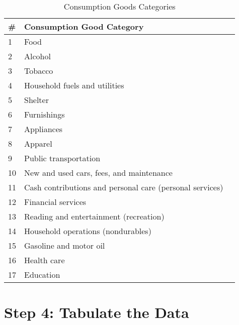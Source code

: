 \documentclass[article,11pt,letterpaper,fleqn]{article}
\theoremstyle{definition}
\numberwithin{equation}{section}
\begin{document}
\begin{table}[!h]
  \centering
  \caption{Consumption Goods Categories}
    \begin{tabular}{lll}
    \hline
    \hline
   \# & Consumption Good Category \\
    \hline
    1     & Food  \\
    2     & Alcohol \\
    3     & Tobacco \\
    4     & Household fuels and utilities \\
    5     & Shelter \\
    6     & Furnishings \\
    7     & Appliances \\
    8     & Apparel \\
    9     & Public transportation \\
    10    & New and used cars, fees, and maintenance \\
    11    & Cash contributions and personal care (personal services) \\
    12    & Financial services \\
    13    & Reading and entertainment (recreation) \\
    14    & Household operations (nondurables) \\
    15    & Gasoline and motor oil \\
    16    & Health care \\
    17    & Education \\
     \hline
    \hline
    \end{tabular}%
  \label{tab:cons_goods}%
\end{table}%

\section*{Step 4: Tabulate the Data}
\label{sec:step4}
\end{document}

